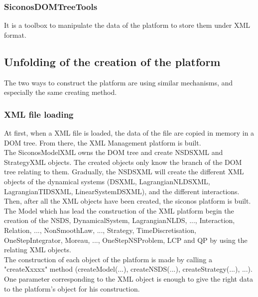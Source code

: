 \subsubsection{SiconosDOMTreeTools}
It is a toolbox to manipulate the data of the platform to store them under XML format.


\subsection{Unfolding of the creation of the platform}
The two ways to construct the platform are using similar mechanisms, and especially the same creating
method.
\subsubsection{XML file loading}
At first, when a XML file is loaded, the data of the file are copied in memory in a DOM tree. From
there, the XML Management platform is built.\\
The SiconosModelXML owns the DOM tree and create NSDSXML and StrategyXML objects. The created objects
only know the branch of the DOM tree relating to them. Gradually, the NSDSXML will create the
different XML objects of the dynamical systems (DSXML, LagrangianNLDSXML, LagrangianTIDSXML,
LinearSystemDSXML), and the different interactions.\\
Then, after all the XML objects have been created, the \ac{siconos} platform is built.\\
The Model which has lead the construction of the XML platform begin the creation of the NSDS,
DynamicalSystem, LagrangianNLDS, ..., Interaction, Relation, ..., NonSmoothLaw, ..., Strategy,
TimeDiscretisation, OneStepIntegrator, Moreau, ..., OneStepNSProblem, LCP and QP by using the
relating XML objects.\\
The construction of each object of the platform is made by calling a
"createXxxxx" method (createModel(...), createNSDS(...), createStrategy(...), ...). One parameter
corresponding to the XML object is enough to give the right data to the platform's object for his
construction.
